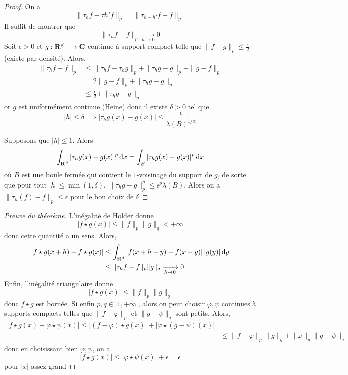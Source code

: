 \begin{proof}
    On a \[\|\tau_h f-\tau h'f\|_p= \|\tau_{h-h'}f-f\|_p.\] Il suffit de montrer que \[\|\tau_hf-f\|_p \xrightarrow[h\to 0]{}0\]
    Soit $\epsilon>0$ et $g: \mathbf R^d\longrightarrow \mathbf C$ continue à support compact telle que $ \|f-g\|_p\leq \frac\epsilon2$ (existe par densité). Alors, 
    \begin{align*}
        \|\tau _h f-f\|_p&\leq \|\tau_hf-\tau_hg\|_p+\|\tau _h g-g\|_p + \|g-f\|_p \\ &= 2\|g-f\|_p + \|\tau_h g-g\|_p \\ &\leq \frac\epsilon2+\|\tau_hg-g\|_p
    \end{align*}
    or $g$ est uniformément continue (Heine) donc il existe $\delta>0$ tel que \[|h|\leq  \delta \implies |\tau_h g(x)-g(x)|\leq\frac\epsilon{\lambda(B)^{1 / \alpha}} \]

    Supposons que $|h|\leq 1$. Alors \[\int_{\mathbf R^d}|\tau_h g(x)-g(x)|^p\mathop{}\!\mathrm d x=\int_B|\tau_h g(x)-g(x)|^p\mathop{}\!\mathrm d x\] où $B$ est une boule fermée qui contient le $1$-voisinage du support de  $g$, de sorte que pour tout  $|h|\leq \min(1, \delta)$, $\|\tau_hg-g\|_p^p\leq \epsilon^p\lambda(B)$. Alors on a $\|\tau_h (f)-f\|_p\leq \epsilon$ pour le bon choix de $\delta$
\end{proof}

\begin{proof}[Preuve du théorème]
    L'inégalité de Hölder donne \[|f\star g(x)|\leq \|f\|_p \|g\|_q<+\infty\] donc cette quantité a un sens. Alors,
    \begin{align*}
        |f\star g(x+h)-f\star g(x)|&\leq \int_{\mathbf R^d}|f(x+h-y)-f(x-y)|\,|g(y)|\mathop{}\!\mathrm d y\\&\leq \|\tau_h f-f\|_p \|g\|_q \xrightarrow[h\to 0]{}0
    \end{align*}
    Enfin, l'inégalité triangulaire donne \[
        |f\star g(x)|\leq \|f\|_p \|g\|_q
    \] 
    donc $f\star g$ est bornée. Si enfin  $p, q \in  ]1, +\infty[$, alors on peut choisir $\varphi, \psi$ continues à supports compacts telles que $\|f-\varphi\|_p$ et $\|g-\psi\|_q$ sont petits. Alors,
    \begin{align*}
        |f\star g(x)-\varphi\star \psi(x)|\leq |(f-\varphi)\star g(x)|+|\varphi\star (g-\psi)(x)| \\ &\leq \|f-\varphi\|_p\|g\|_q + \|\varphi\|_p\|g-\psi\|_q
    \end{align*}
    donc en choisissant bien $\varphi, \psi$, on a \[|f\star g(x)|\leq |\varphi\star \psi(x)|+\epsilon=\epsilon\] pour $|x|$ assez grand
\end{proof}

